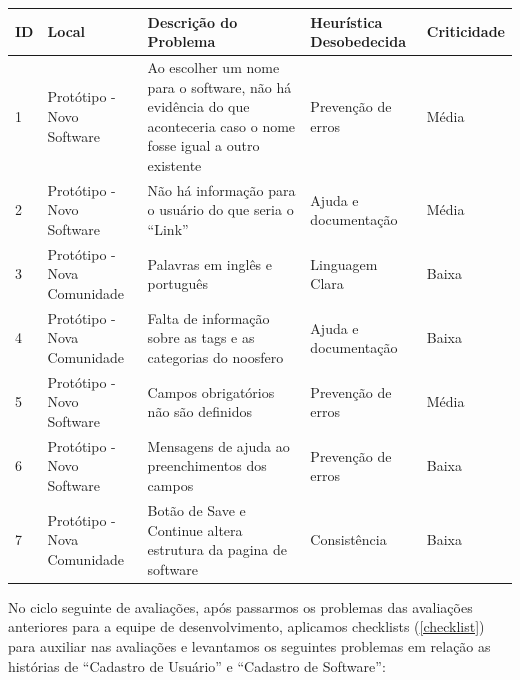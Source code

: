 \begin{table}[h!]
\begin{tabular}{|l|p{3cm}|p{6cm}|p{3cm}|l|}
\hline
\textbf{ID} & \textbf{Local} & \textbf{Descrição do Problema}                                                                                     & \textbf{Heurística Desobedecida} & \textbf{Criticidade} \\ \hline
1           & Protótipo - Novo Software                 & Ao escolher um nome para o software, não há evidência do que aconteceria caso o nome fosse igual a outro existente & Prevenção de erros               & Média                \\ \hline
2           & Protótipo - Novo Software                 & Não há informação para o usuário do que seria o ``Link''                                                             & Ajuda e documentação             & Média                \\ \hline
3           & Protótipo - Nova Comunidade               & Palavras em inglês e português                                                                                     & Linguagem Clara                   & Baixa                \\ \hline
4           & Protótipo - Nova Comunidade               & Falta de informação sobre as tags e as categorias do noosfero                                                      & Ajuda e documentação             & Baixa                \\ \hline
5           & Protótipo - Novo Software                 & Campos obrigatórios não são definidos                                                                              & Prevenção de erros               & Média                \\ \hline
6           & Protótipo - Novo Software    & Mensagens de ajuda ao preenchimentos dos campos                                                                    & Prevenção de erros               & Baixa                \\ \hline
7           & Protótipo - Nova Comunidade               & Botão de Save e Continue altera estrutura da pagina de software                                                    & Consistência                     & Baixa                \\ \hline
\end{tabular}
\end{table}

No ciclo seguinte de avaliações, após passarmos os problemas das avaliações anteriores para a equipe de desenvolvimento, aplicamos checklists (\ref{checklist}) para auxiliar nas avaliações e levantamos os seguintes problemas em relação as histórias de ``Cadastro de Usuário'' e ``Cadastro de Software'':

